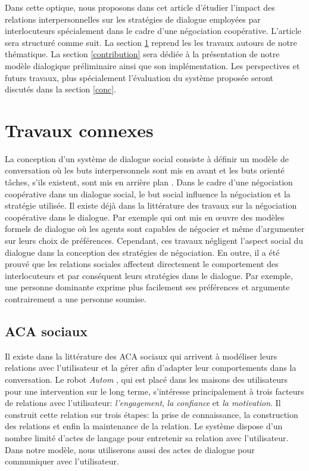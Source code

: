 \documentclass [french]{sig-alternate-05-2015}
\begin{document}
\par Dans cette optique, nous proposons dans cet article d'étudier l'impact des relations interpersonnelles sur les stratégies de dialogue employées par interlocuteurs spécialement dans le cadre d'une négociation coopérative. L'article sera structuré comme suit. La section \ref{RW} reprend les les travaux autours de notre thématique. La section \ref{contribution} sera dédiée à la présentation de notre modèle dialogique préliminaire ainsi que son implémentation. Les perspectives et futurs travaux, plus spécialement l'évaluation du système proposée seront discutés dans la section \ref{conc}.

\section{Travaux connexes}
\label{RW}
  
La conception d'un système de dialogue social consiste à définir un modèle de conversation où les buts interpersonnels sont mis en avant et les buts orienté tâches, s'ils existent, sont mis en arrière plan \cite{bickmore2005establishing}. Dans le cadre d'une négociation coopérative dans un dialogue social, le but social influence la négociation et la stratégie utilisée. Il existe déjà dans la littérature des travaux sur la négociation coopérative dans le dialogue. Par exemple \cite{amgoud2000arguments, daskalopulu1998handling} qui ont mis en œuvre des modèles formels de dialogue où les agents sont capables de négocier et même d'argumenter sur leurs choix de préférences. Cependant, ces travaux négligent l'aspect social du dialogue dans la conception des stratégies de négociation. En outre, il a été prouvé que les relations sociales affectent directement le comportement des interlocuteurs \cite{bickmore2012empirical, bickmore2005establishing, moon1998intimate, nass2000does} et par conséquent leurs stratégies dans le dialogue. Par exemple, une personne dominante exprime plus facilement ses préférences et argumente contrairement a une personne soumise. 

\subsection{ACA sociaux}

\par Il existe dans la littérature des  ACA sociaux  qui arrivent à modéliser leurs relations avec l'utilisateur et la gérer afin d'adapter leur comportements dans la conversation. Le robot \textit{Autom} \cite{kidd2005sociable}, qui est placé dans les maisons des utilisateurs pour une intervention sur le long terme, s'intéresse principalement à trois facteurs de relations avec l'utilisateur: \textit{l'engagement}, \textit{la confiance} et \textit{la motivation}. Il construit cette relation sur trois étapes: la prise de connaissance, la construction des relations et enfin la maintenance de la relation. Le système dispose d'un nombre limité d'actes de langage pour  entretenir sa relation avec l'utilisateur. Dans notre modèle, nous utiliserons aussi des actes de dialogue pour communiquer avec l'utilisateur.
\end{document}
